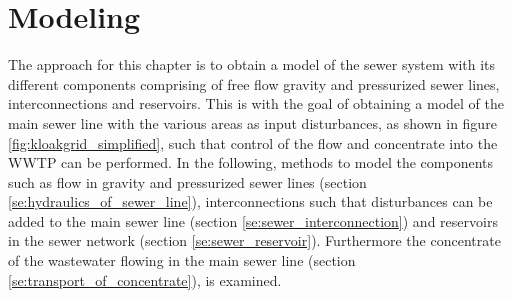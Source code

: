 \chapter{Modeling}\label{se:modeling}

The approach for this chapter is to obtain a model of the sewer system with its different components comprising of free flow gravity and pressurized sewer lines, interconnections and reservoirs. 
This is with the goal of obtaining a model of the main sewer line with the various areas as input disturbances, as shown in figure \ref{fig:kloakgrid_simplified}, such that control of the flow and concentrate into the WWTP can be performed. 
In the following, methods to model the components such as flow in gravity and pressurized sewer lines (section \ref{se:hydraulics_of_sewer_line}), interconnections such that disturbances can be added to the main sewer line (section \ref{se:sewer_interconnection}) and reservoirs in the sewer network (section \ref{se:sewer_reservoir}). Furthermore the concentrate of the wastewater flowing in the main sewer line (section \ref{se:transport_of_concentrate}), is examined.






